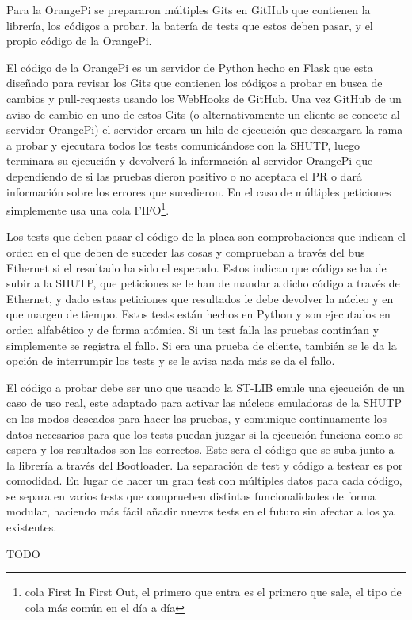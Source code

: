 \documentclass{report}
\begin{document}
Para la OrangePi se prepararon múltiples Gits en GitHub que contienen la librería, los códigos a probar, la batería de tests que estos deben pasar, y el propio código de la OrangePi. \par
El código de la OrangePi es un servidor de Python hecho en Flask que esta diseñado para revisar los Gits que contienen los códigos a probar en busca de cambios y pull-requests usando los WebHooks de GitHub. Una vez GitHub de un aviso de cambio en uno de estos Gits (o alternativamente un cliente se conecte al servidor OrangePi) el servidor creara un hilo de ejecución que descargara la rama a probar y ejecutara todos los tests comunicándose con la SHUTP, luego terminara su ejecución y devolverá la información al servidor OrangePi que dependiendo de si las pruebas dieron positivo o no aceptara el PR o dará información sobre los errores que sucedieron. En el caso de múltiples peticiones simplemente usa una cola FIFO\footnote{cola First In First Out, el primero que entra es el primero que sale, el tipo de cola más común en el día a día}. \par
Los tests que deben pasar el código de la placa son comprobaciones que indican el orden en el que deben de suceder las cosas y comprueban a través del bus Ethernet si el resultado ha sido el esperado. Estos indican que código se ha de subir a la SHUTP, que peticiones se le han de mandar a dicho código a través de Ethernet, y dado estas peticiones que resultados le debe devolver la núcleo y en que margen de tiempo. Estos tests están hechos en Python y son ejecutados en orden alfabético y de forma atómica. Si un test falla las pruebas continúan y simplemente se registra el fallo. Si era una prueba de cliente, también se le da la opción de interrumpir los tests y se le avisa nada más se da el fallo. \par
El código a probar debe ser uno que usando la ST-LIB emule una ejecución de un caso de uso real, este adaptado para activar las núcleos emuladoras de la SHUTP en los modos deseados para hacer las pruebas, y comunique continuamente los datos necesarios para que los tests puedan juzgar si la ejecución funciona como se espera y los resultados son los correctos. Este sera el código que se suba junto a la librería a través del Bootloader. La separación de test y código a testear es por comodidad. En lugar de hacer un gran test con múltiples datos para cada código, se separa en varios tests que comprueben distintas funcionalidades de forma modular, haciendo más fácil añadir nuevos tests en el futuro sin afectar a los ya existentes.
\par \vspace{0.3cm}

TODO




\end{document}
